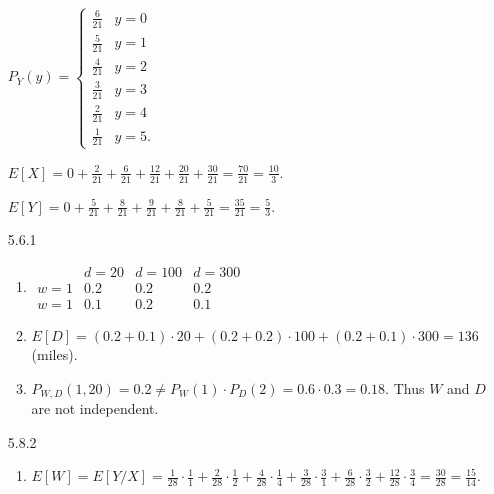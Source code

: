 \documentclass{article}
\begin{document}
\begin{enumerate}
    $P_Y(y) = \begin{cases}
        \frac{6}{21} & y = 0 \\
        \frac{5}{21} & y = 1 \\
        \frac{4}{21} & y = 2 \\
        \frac{3}{21} & y = 3 \\
        \frac{2}{21} & y = 4 \\
        \frac{1}{21} & y = 5.
    \end{cases}
    $

    $E[X] = 0 + \frac{2}{21} + \frac{6}{21} + \frac{12}{21} + \frac{20}{21} + \frac{30}{21} = \frac{70}{21} = \frac{10}{3}$.

    $E[Y] = 0 + \frac{5}{21} + \frac{8}{21} + \frac{9}{21} + \frac{8}{21} + \frac{5}{21} = \frac{35}{21} = \frac{5}{3}$.

    \item [5.6.1]

    \begin{enumerate}[label=(\alph*)]
        \item
            $
            \begin{array}{c|ccc}
                & d = 20 & d = 100 & d = 300 \\
            \hline
            w = 1 & 0.2    & 0.2     & 0.2 \\
            w = 1 & 0.1    & 0.2     & 0.1
            \end{array}
            $


        \item
            $E[D] = (0.2 + 0.1) \cdot 20 + (0.2 + 0.2) \cdot 100 + (0.2 + 0.1) \cdot 300 = 136$ (miles).

        \item $P_{W, D}(1, 20) = 0.2 \ne P_W(1) \cdot P_D(2) = 0.6 \cdot 0.3 = 0.18$. Thus $W$ and $D$ are not independent.
    \end{enumerate}

    \item [5.8.2]

    \begin{enumerate}[label=(\alph*)]
        \item 
        $E[W] = E[Y / X] = \frac{1}{28} \cdot \frac{1}{1}                  
                         + \frac{2}{28} \cdot \frac{1}{2}
                         + \frac{4}{28} \cdot \frac{1}{4}
                         + \frac{3}{28} \cdot \frac{3}{1}
                         + \frac{6}{28} \cdot \frac{3}{2}
                         + \frac{12}{28} \cdot \frac{3}{4} = \frac{30}{28} = \frac{15}{14}$.


\end{enumerate}
\end{enumerate}
\end{document}
